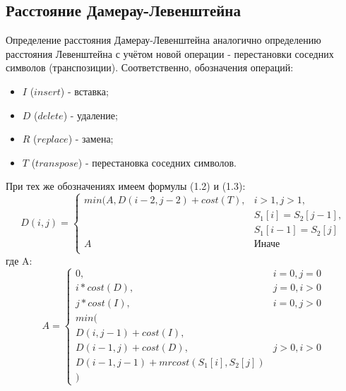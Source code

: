 \subsection{Расстояние Дамерау-Левенштейна}
Определение расстояния Дамерау-Левенштейна аналогично определению расстояния Левенштейна с учётом новой операции - перестановки соседних символов (транспозиции). Соответственно, обозначения операций:
\begin{itemize}
    \item $I$ ($insert$) - вставка;
    \item $D$ ($delete$) - удаление;
    \item $R$ ($replace$) - замена;
    \item $T$ ($transpose$) - перестановка соседних символов.
\end{itemize}

При тех же обозначениях имеем формулы (1.2) и (1.3):
\begin{equation}
D(i,j) = \left\{ \begin{array}{ll}
 min(A, D(i - 2, j - 2) + cost(T), & \textrm{$i > 1, j > 1,$}\\
 & \textrm{$S_1[i] = S_2[j - 1],$}\\
 & \textrm{$S_1[i - 1] = S_2[j]$}\\
 A & \textrm{Иначе}\\
  \end{array} \right.
\end{equation}
где A:
\begin{equation}
A = \left\{ \begin{array}{ll}
 0, & \textrm{$i = 0, j = 0$}\\
 i * cost(D), & \textrm{$j = 0, i > 0$}\\
 j * cost(I), & \textrm{$i = 0, j > 0$}\\
min(\\
D(i,j-1) + cost(I),\\
D(i-1, j) + cost(D), &\textrm{$j > 0, i > 0$}\\
D(i-1, j-1) + mrcost(S_1[i], S_2[j])\\
)
  \end{array} \right.
\end{equation}


